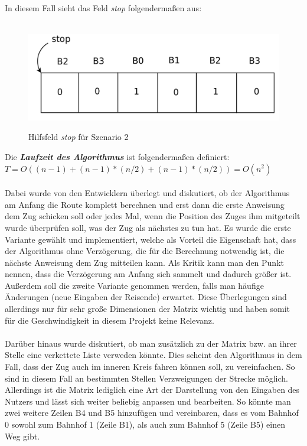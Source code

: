 In diesem Fall sieht das Feld \textit{stop} folgendermaßen aus:\\
\\
\begin{figure}[H]	
\caption{Hilfsfeld \textit{stop} für Szenario 2}
\includegraphics[width=2\textwidth, width=450pt]{content/images/stop2.png}
\label{pic:stop2}
\end{figure}
Die \textbf{\textit{Laufzeit des Algorithmus}} ist folgendermaßen definiert:\\
$T = O( (n-1) + (n-1)*(n/2) + (n-1)*(n/2) ) = O(n^2)$\\
\\
Dabei wurde von den Entwicklern überlegt und diskutiert, ob der Algorithmus am Anfang die Route komplett berechnen und erst dann die erste Anweisung dem Zug schicken soll oder jedes Mal, wenn die Position des Zuges ihm mitgeteilt wurde überprüfen soll, was der Zug als nächstes zu tun hat. Es wurde die erste Variante gewählt und implementiert, welche als Vorteil die Eigenschaft hat, dass der Algorithmus ohne Verzögerung, die für die Berechnung notwendig ist, die nächste Anweisung dem Zug mitteilen kann. Als Kritik kann man den Punkt nennen, dass die Verzögerung am Anfang sich sammelt und dadurch größer ist. Außerdem soll die zweite Variante genommen werden, falls man häufige Änderungen (neue Eingaben der Reisende) erwartet. Diese Überlegungen sind allerdings nur für sehr große Dimensionen der Matrix wichtig und haben somit für die Geschwindigkeit in diesem Projekt keine Relevanz.\\
\\
Darüber hinaus wurde diskutiert, ob man zusätzlich zu der Matrix bzw. an ihrer Stelle eine verkettete Liste verweden könnte. Dies scheint den Algorithmus in dem Fall, dass der Zug auch im inneren Kreis fahren können soll, zu vereinfachen. So sind in diesem Fall an bestimmten Stellen Verzweigungen der Strecke möglich. Allerdings ist die Matrix lediglich eine Art der Darstellung von den Eingaben des Nutzers und lässt sich weiter beliebig anpassen und bearbeiten. So könnte man zwei weitere Zeilen B4 und B5 hinzufügen und vereinbaren, dass es vom Bahnhof 0 sowohl zum Bahnhof 1 (Zeile B1), als auch zum Bahnhof 5 (Zeile B5) einen Weg gibt.\\


